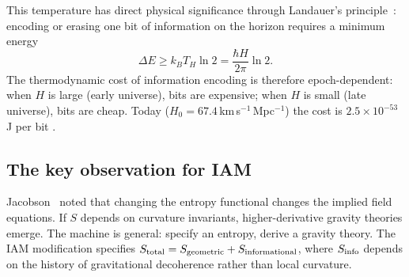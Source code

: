 This temperature has direct physical significance through Landauer's principle~\cite{Landauer1961}: encoding or erasing one bit of information on the horizon requires a
minimum energy
\begin{equation}\Delta E\ge k_BT_H\ln2=\frac{\hbar H}{2\pi}\ln2 .\label{eq:th:bitcost}\end{equation}
The thermodynamic cost of information encoding is therefore epoch-dependent: when $H$ is large (early universe), bits are expensive; when $H$ is small
(late universe), bits are cheap. Today ($H_0=67.4$\,km\,s$^{-1}$\,Mpc$^{-1}$) the cost is $2.5\times10^{-53}$\,J per bit \calc.

\subsection{The key observation for IAM}\label{sec:th:key}
Jacobson~\cite{Jacobson1995} noted that changing the entropy functional changes the implied field equations. If $S$ depends on curvature invariants, higher-derivative
gravity theories emerge. The machine is general: specify an entropy, derive a gravity theory. The IAM modification specifies
$S_{\rm total}=S_{\rm geometric}+S_{\rm informational}$, where $S_{\rm info}$ depends on the history of gravitational decoherence rather than local curvature.

